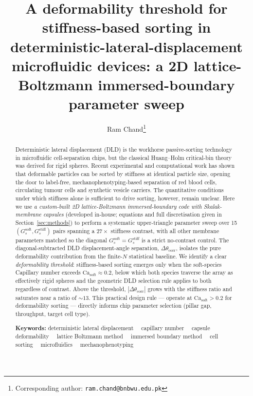 \documentclass[11pt,a4paper]{article}
\title{\textbf{A deformability threshold for stiffness-based sorting
       in deterministic-lateral-displacement microfluidic devices:
       a 2D lattice-Boltzmann immersed-boundary parameter sweep}}
\author[1]{Ram Chand\thanks{Corresponding author:
   \texttt{ram.chand@bnbwu.edu.pk}}}
\affil[1]{Department of Natural Sciences,
   The Begum Nusrat Bhutto Women University,
   Sukkur, Sindh, Pakistan}
\begin{document}

\maketitle

\begin{abstract}
\noindent Deterministic lateral displacement (DLD) is the workhorse
passive-sorting technology in microfluidic cell-separation chips, but
the classical Huang--Holm critical-bin theory was derived for rigid
spheres. Recent experimental and computational work has shown that
deformable particles can be sorted by stiffness at identical particle
size, opening the door to label-free, mechanophenotyping-based
separation of red blood cells, circulating tumour cells and synthetic
vesicle carriers. The quantitative conditions under which stiffness
alone is sufficient to drive sorting, however, remain unclear. Here
we use \emph{a custom-built 2D lattice-Boltzmann immersed-boundary
code with Skalak-membrane capsules} (developed in-house; equations
and full discretisation given in Section~\ref{sec:methods}) to
perform a systematic upper-triangle parameter sweep over 15
$(G_s^{\text{soft}}, G_s^{\text{stiff}})$ pairs spanning a
$27\times$ stiffness contrast, with all other membrane parameters
matched so the diagonal $G_s^{\text{soft}} = G_s^{\text{stiff}}$ is a
strict no-contrast control. The diagonal-subtracted DLD
displacement-angle separation,
$\Delta\theta_{\text{corr}}$, isolates the pure deformability
contribution from the finite-$N$ statistical baseline. We identify a
clear \emph{deformability threshold}: stiffness-based sorting emerges
only when the soft-species Capillary number exceeds
$\mathrm{Ca}_{\text{soft}} \approx 0.2$, below which both species
traverse the array as effectively rigid spheres and the geometric DLD
selection rule applies to both regardless of contrast. Above the
threshold, $|\Delta\theta_{\text{corr}}|$ grows with the stiffness
ratio and saturates near a ratio of $\sim 13$. This practical design
rule --- operate at $\mathrm{Ca}_{\text{soft}} > 0.2$ for
deformability sorting --- directly informs chip parameter selection
(pillar gap, throughput, target cell type).

\vspace{1em}
\noindent\textbf{Keywords:}
deterministic lateral displacement~\textperiodcentered~
capillary number~\textperiodcentered~
capsule deformability~\textperiodcentered~
lattice Boltzmann method~\textperiodcentered~
immersed boundary method~\textperiodcentered~
cell sorting~\textperiodcentered~
microfluidics~\textperiodcentered~
mechanophenotyping
\end{abstract}
\end{document}

